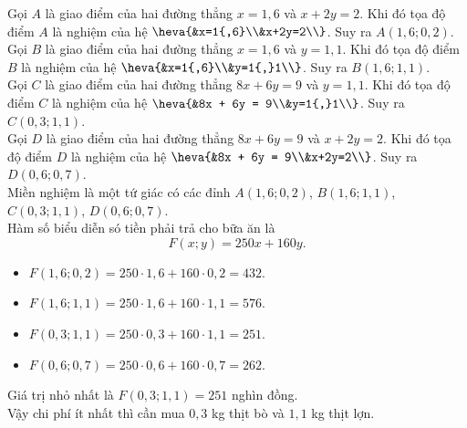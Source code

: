 \begin{bt}
{\begin{center}
		\end{center}
		Gọi $A$ là giao điểm của hai đường thẳng $x = 1{,}6$ và $x+2y=2$. Khi đó tọa độ điểm $A$ là nghiệm của hệ $\heva{&x=1{,6}\\&x+2y=2\\}$. Suy ra $A(1{,}6; 0{,}2)$.\\
		Gọi $B$ là giao điểm của hai đường thẳng $x = 1{,}6$ và $y=1{,}1$. Khi đó tọa độ điểm $B$ là nghiệm của hệ $\heva{&x=1{,6}\\&y=1{,}1\\}$. Suy ra $B(1{,}6; 1{,}1)$.\\
		Gọi $C$ là giao điểm của hai đường thẳng $8x + 6y = 9$ và $y=1{,}1$. Khi đó tọa độ điểm $C$ là nghiệm của hệ $\heva{&8x + 6y = 9\\&y=1{,}1\\}$. Suy ra $C(0{,}3; 1{,}1)$.\\
		Gọi $D$ là giao điểm của hai đường thẳng $8x + 6y = 9$ và $x+2y=2$. Khi đó tọa độ điểm $D$ là nghiệm của hệ $\heva{&8x + 6y = 9\\&x+2y=2\\}$. Suy ra $D(0{,}6; 0{,}7)$.\\
		Miền nghiệm là một tứ giác có các đỉnh $A(1{,}6; 0{,}2)$, $B(1{,}6; 1{,}1)$, $C(0{,}3; 1{,}1)$, $D(0{,}6; 0{,}7)$.\\
		Hàm số biểu diễn só tiền phải trả cho bữa ăn là $$F(x;y) = 250x + 160y.$$
		\begin{itemize}
			\item $F(1{,}6; 0{,}2) = 250\cdot 1{,}6 + 160 \cdot 0{,}2=432$.
			\item $F(1{,}6;1{,}1)=250\cdot 1{,}6+160\cdot 1{,}1=576$.
			\item $F(0{,}3;1{,}1)=250\cdot 0{,}3+160\cdot 1{,}1=251$.
			\item $F(0{,}6;0{,}7)=250\cdot 0{,}6+160\cdot 0{,}7=262$.
		\end{itemize}
		Giá trị nhỏ nhất là $F(0{,}3;1{,}1) = 251$ nghìn đồng.\\
		Vậy chi phí ít nhất thì cần mua $0{,}3$ kg thịt bò và $1{,}1$ kg thịt lợn.
	}
\end{bt}

